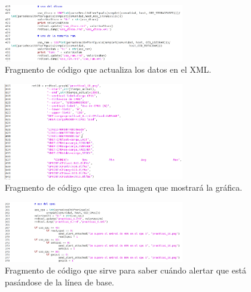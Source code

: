 \begin{figure}[!htpb]
	\hypertarget{fig:actualizacionXmlLineaBase}{\hspace{1pt}}
	\begin{center}
		\includegraphics[width=0.7\textwidth]{imagenes/LineaBase/actualizacionXmlLineaBase.png}
		\caption{Fragmento de código que actualiza los datos en el XML.}
		\label{fig:actualizacionXmlLineaBase}	
	\end{center}
\end{figure}


\begin{figure}[!htpb]
	\hypertarget{fig:creacionImagenLineaBase}{\hspace{1pt}}
	\begin{center}
		\includegraphics[width=0.7\textwidth]{imagenes/LineaBase/creacionImagenLineaBase.png}
		\caption{Fragmento de código que crea la imagen que mostrará la gráfica.}
		\label{fig:creacionImagenLineaBase}	
	\end{center}
\end{figure}


\begin{figure}[!htpb]
	\hypertarget{fig:envioAlertaLineaBase}{\hspace{1pt}}
	\begin{center}
		\includegraphics[width=0.7\textwidth]{imagenes/LineaBase/envioAlertaLineaBase.png}
		\caption{Fragmento de código que sirve para saber cuándo alertar que está pasándose de la línea de base.}
		\label{fig:envioAlertaLineaBase}	
	\end{center}
\end{figure}


